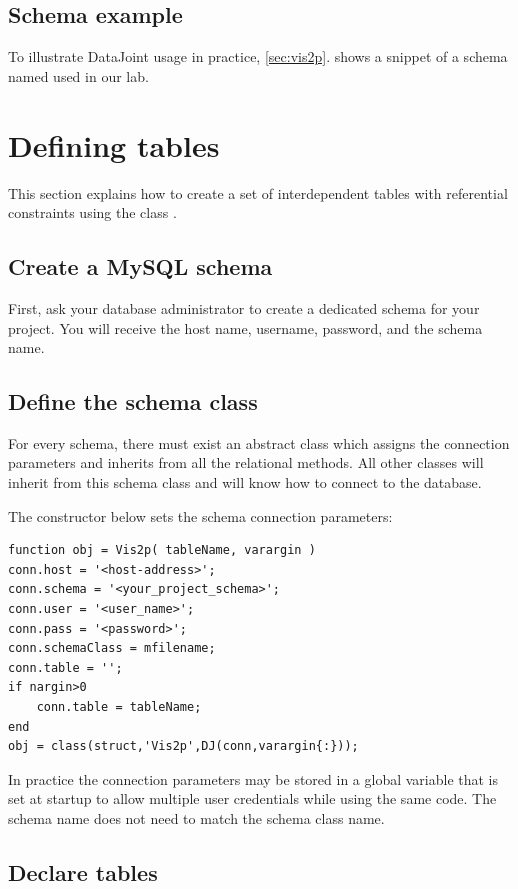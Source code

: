 \documentclass[10pt]{article}
\begin{document}
\subsection{Schema example}
To illustrate DataJoint usage in practice, \autoref{sec:vis2p}. shows a snippet of a schema named  used in our lab.


\newpage\section{Defining tables}\label{sec:definition}

This section explains how to create a set of interdependent tables with referential constraints using the class .

\subsection{Create a MySQL schema}
First, ask your database administrator to create a dedicated schema for your project.  You will receive the host name, username, password, and the schema name.

\subsection{Define the schema class}

For every schema, there must exist an abstract class which assigns the connection parameters and inherits from  all the relational methods.  All other classes will inherit from this schema class and will know how to connect to the database.  

The  constructor below sets the schema connection parameters:

\begin{lstlisting}
function obj = Vis2p( tableName, varargin )
conn.host = '<host-address>';
conn.schema = '<your_project_schema>';
conn.user = '<user_name>';
conn.pass = '<password>';
conn.schemaClass = mfilename;
conn.table = '';
if nargin>0
    conn.table = tableName;
end
obj = class(struct,'Vis2p',DJ(conn,varargin{:})); 
\end{lstlisting}

In practice the connection parameters may be stored in a global variable that is set at startup to allow multiple user credentials while using the same code.  The schema name does not need to match the schema class name.

\subsection{Declare tables} 
\end{document}
